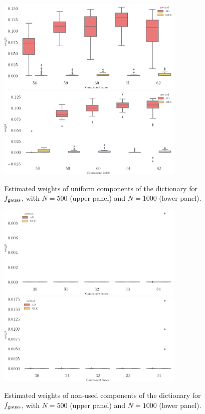 \begin{figure}
\center
    \includegraphics[width=0.8\textwidth]{./TeX_files/weight_f_gauss_unif_comp_N_500.png}
    \includegraphics[width=0.8\textwidth]{./TeX_files/weight_f_gauss_unif_comp_N_1000.png}
    \caption{Estimated weights of uniform components of the dictionary for $f_{\textnormal{gauss}}$, with $N=500$ (upper panel) and $N=1000$
    (lower panel).}{}
    \label{fig:weights_gauss_unif_indexes}
\end{figure}
\begin{figure}
\center
    \includegraphics[width=0.8\textwidth]{./TeX_files/weight_f_gauss_other_comp_N_500.png}
    \includegraphics[width=0.8\textwidth]{./TeX_files/weight_f_gauss_other_comp_N_1000.png}
    \caption{Estimated weights of non-used components of the dictionary for $f_{\textnormal{gauss}}$, with $N=500$ (upper panel) and $N=1000$
    (lower panel).}
    \label{fig:weights_gauss_other_indexes}
\end{figure}
